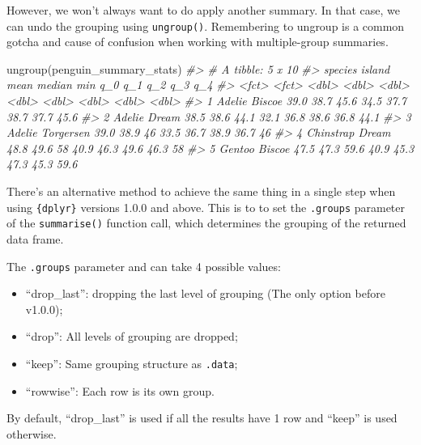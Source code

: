 \documentclass[
  12pt,
]{book}
\newenvironment{Shaded}{\begin{snugshade}}{\end{snugshade}}
\newcommand{\CommentTok}[1]{\textcolor[rgb]{0.56,0.35,0.01}{\textit{#1}}}
\newcommand{\FunctionTok}[1]{\textcolor[rgb]{0.00,0.00,0.00}{#1}}
\newcommand{\NormalTok}[1]{#1}
\begin{document}
However, we won't always want to do apply another summary. In that case, we can undo the grouping using \texttt{ungroup()}. Remembering to ungroup is a common gotcha and cause of confusion when working with multiple-group summaries.

\begin{Shaded}
\begin{Highlighting}[]
\FunctionTok{ungroup}\NormalTok{(penguin\_summary\_stats)}
\CommentTok{\#\textgreater{} \# A tibble: 5 x 10}
\CommentTok{\#\textgreater{}   species   island     mean median   min   q\_0   q\_1   q\_2   q\_3   q\_4}
\CommentTok{\#\textgreater{}   \textless{}fct\textgreater{}     \textless{}fct\textgreater{}     \textless{}dbl\textgreater{}  \textless{}dbl\textgreater{} \textless{}dbl\textgreater{} \textless{}dbl\textgreater{} \textless{}dbl\textgreater{} \textless{}dbl\textgreater{} \textless{}dbl\textgreater{} \textless{}dbl\textgreater{}}
\CommentTok{\#\textgreater{} 1 Adelie    Biscoe     39.0   38.7  45.6  34.5  37.7  38.7  37.7  45.6}
\CommentTok{\#\textgreater{} 2 Adelie    Dream      38.5   38.6  44.1  32.1  36.8  38.6  36.8  44.1}
\CommentTok{\#\textgreater{} 3 Adelie    Torgersen  39.0   38.9  46    33.5  36.7  38.9  36.7  46  }
\CommentTok{\#\textgreater{} 4 Chinstrap Dream      48.8   49.6  58    40.9  46.3  49.6  46.3  58  }
\CommentTok{\#\textgreater{} 5 Gentoo    Biscoe     47.5   47.3  59.6  40.9  45.3  47.3  45.3  59.6}
\end{Highlighting}
\end{Shaded}

There's an alternative method to achieve the same thing in a single step when using \texttt{\{dplyr\}} versions 1.0.0 and above. This is to to set the \texttt{.groups} parameter of the \texttt{summarise()} function call, which determines the grouping of the returned data frame.

The \texttt{.groups} parameter and can take 4 possible values:

\begin{itemize}
\item
  ``drop\_last'': dropping the last level of grouping (The only option before v1.0.0);
\item
  ``drop'': All levels of grouping are dropped;
\item
  ``keep'': Same grouping structure as \texttt{.data};
\item
  ``rowwise'': Each row is its own group.
\end{itemize}

By default, ``drop\_last'' is used if all the results have 1 row and ``keep'' is used otherwise.
\end{document}
